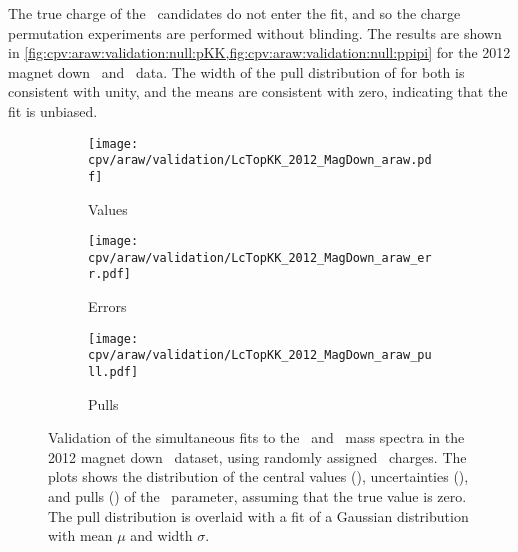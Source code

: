 
The true charge of the \PLambdac\ candidates do not enter the fit, and so the 
charge permutation experiments are performed without blinding.
The results are shown in 
\cref{fig:cpv:araw:validation:null:pKK,fig:cpv:araw:validation:null:ppipi} for 
the 2012 magnet down \pKK\ and \ppipi\ data.
The width of the pull distribution of \ARaw for both is consistent with unity, 
and the means are consistent with zero, indicating that the fit is unbiased.

\begin{figure}
  \begin{subfigure}[t]{0.32\textwidth}
    \texttt{[image: cpv/araw/validation/LcTopKK\_2012\_MagDown\_araw.pdf]}
    \caption{Values}
    \label{fig:cpv:araw:validation:null:pKK:values}
  \end{subfigure}
  \begin{subfigure}[t]{0.32\textwidth}
    \texttt{[image: cpv/araw/validation/LcTopKK\_2012\_MagDown\_araw\_err.pdf]}
    \caption{Errors}
    \label{fig:cpv:araw:validation:null:pKK:errors}
  \end{subfigure}
  \begin{subfigure}[t]{0.32\textwidth}
    \texttt{[image: cpv/araw/validation/LcTopKK\_2012\_MagDown\_araw\_pull.pdf]}
    \caption{Pulls}
    \label{fig:cpv:araw:validation:null:pKK:pulls}
  \end{subfigure}
  \caption{%
    Validation of the simultaneous fits to the \PLambdac\ and \APLambdac\ mass 
    spectra in the 2012 magnet down \pKK\ dataset, using randomly assigned 
    \PLambdac\ charges.
    The plots shows the distribution of the central values 
    (), uncertainties 
    (), and pulls 
    () of the \ARaw\ parameter, 
    assuming that the true value is zero.
    The pull distribution is overlaid with a fit of a Gaussian distribution 
    with mean $\mu$ and width $\sigma$.
  }
  \label{fig:cpv:araw:validation:null:pKK}
\end{figure}


